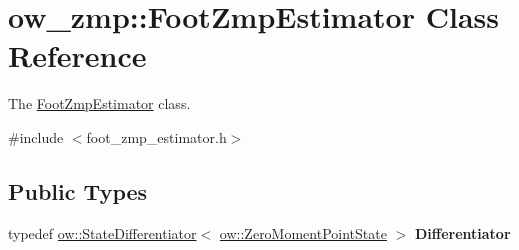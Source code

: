 \hypertarget{classow__zmp_1_1FootZmpEstimator}{}\section{ow\+\_\+zmp\+:\+:Foot\+Zmp\+Estimator Class Reference}
\label{classow__zmp_1_1FootZmpEstimator}


The \hyperlink{classow__zmp_1_1FootZmpEstimator}{Foot\+Zmp\+Estimator} class.  




{\ttfamily \#include $<$foot\+\_\+zmp\+\_\+estimator.\+h$>$}

\subsection*{Public Types}
\begin{DoxyCompactItemize}
\item 
typedef \hyperlink{classow__core_1_1StateDifferentiator}{ow\+::\+State\+Differentiator}$<$ \hyperlink{classow__core_1_1ZeroMomentPointState}{ow\+::\+Zero\+Moment\+Point\+State} $>$ {\bfseries Differentiator}\hypertarget{classow__zmp_1_1FootZmpEstimator_aae9d8e2635c31987d4cbff058cc63411}{}\label{classow__zmp_1_1FootZmpEstimator_aae9d8e2635c31987d4cbff058cc63411}

\end{DoxyCompactItemize}
